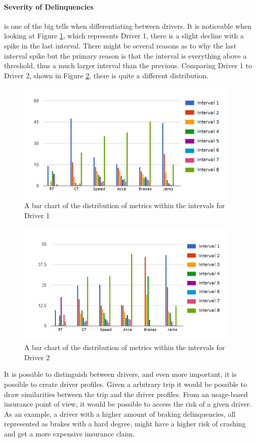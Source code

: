 \paragraph{Severity of Delinquencies} is one of the big tells when differentiating between drivers. It is noticeable when looking at Figure \ref{fig:car8intervals}, which represents Driver 1, there is a slight decline with a spike in the last interval. There might be several reasons as to why the last interval spike but the primary reason is that the interval is everything above a threshold, thus a much larger interval than the previous. Comparing Driver 1 to Driver 2, shown in Figure \ref{fig:car21intervals}, there is quite a different distribution.

\begin{figure}[tb]
\centering
\includegraphics[width=0.95\textwidth]{Pictures/car8intervals}
\caption{A bar chart of the distribution of metrics within the intervals for Driver 1}
\label{fig:car8intervals}
\end{figure}

\begin{figure}[tb]
\centering
\includegraphics[width=0.95\textwidth]{Pictures/car21intervals}
\caption{A bar chart of the distribution of metrics within the intervals for Driver 2}
\label{fig:car21intervals}
\end{figure}

It is possible to distinguish between drivers, and even more important, it is possible to create driver profiles. Given a arbitrary trip it would be possible to draw similarities between the trip and the driver profiles. From an usage-based insurance point of view, it would be possible to access the risk of a given driver. As an example, a driver with a higher amount of braking delinquencies, all represented as brakes with a hard degree, might have a higher risk of crashing and get a more expensive insurance claim.
